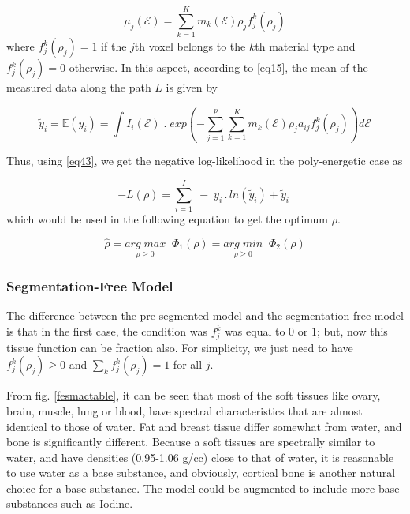 \begin{equation}
\label{eq53}
\mu_j(\mathcal{E}) = \sum \limits_{k=1}^K m_k(\mathcal{E}) \rho_j f_{j}^{k}(\rho_j)
\end{equation} where $f_{j}^{k}(\rho_j) = 1$ if the $j$th voxel belongs to the $k$th material type and $f_{j}^{k}(\rho_j) = 0$ otherwise. In this aspect, according to \ref{eq15}, the mean of the measured data along the path $L$ is given by

\begin{equation}
\label{eq54}
\widetilde{y}_{i} = \mathbb{E}(y_i) = \int I_i(\mathcal{E}) \; . \; exp \left( - \sum\limits_{j=1}^p \sum \limits_{k=1}^K m_k(\mathcal{E}) \rho_j a_{ij} f_{j}^{k}(\rho_j) \right) d\mathcal{E}
\end{equation}

Thus, using \ref{eq43}, we get the negative log-likelihood in the poly-energetic case as

\begin{equation}
\label{eq55}
- L (\rho) = \sum\limits_{i=1}^I \; - \; y_i \, . \, ln(\widetilde{y}_{i}) + \widetilde{y}_{i} \;
\end{equation} which would be used in the following equation to get the optimum $\rho$.

\begin{equation}
\label{eq56}
\widehat{\rho} = \underset{\rho \geqslant 0 }{arg \; max} \; \; \Phi_1(\rho) = \underset{\rho \geqslant 0 }{arg \; min} \; \; \Phi_2(\rho)
\end{equation}


\subsubsection{Segmentation-Free Model}

The difference between the pre-segmented model and the segmentation free model is that in the first case, the condition was $f_{j}^{k}$ was equal to  $0$ or $1$; but, now this tissue function can be fraction also. For simplicity, we just need to have $f_{j}^{k}(\rho_j) \geqslant 0$ and $\sum \limits_k  f_{j}^{k}(\rho_j) = 1$ for all $j$. 

From fig. \ref{fesmactable}, it can be seen that most of the soft tissues like ovary, brain, muscle, lung or blood, have spectral characteristics that are almost identical to those of water. Fat and breast tissue differ somewhat from water, and bone is significantly different. Because a soft tissues are spectrally similar to water, and have densities (0.95-1.06 g/cc) close to that of water, it is reasonable to use water as a base substance, and obviously, cortical bone is another natural choice for a base substance. The model could be augmented to include more base substances such as Iodine. 



